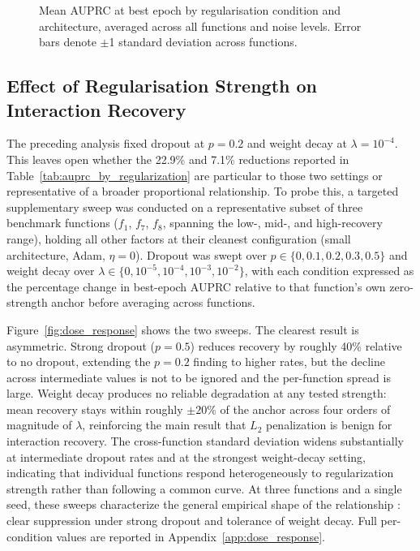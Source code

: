 \documentclass{article}
\begin{document}
\begin{figure}[htbp]
    \centering
    
    \caption{Mean AUPRC at best epoch by regularisation condition
    and architecture, averaged across all functions and noise levels.
    Error bars denote $\pm$1 standard deviation across functions.}
    \label{fig:architecture_x_regularization}
\end{figure}

\FloatBarrier

\subsection{Effect of Regularisation Strength on Interaction Recovery}
\label{sec:dose_response}

The preceding analysis fixed dropout at $p = 0.2$ and weight decay at
$\lambda = 10^{-4}$. This leaves open whether the 22.9\% and 7.1\% reductions
reported in Table~\ref{tab:auprc_by_regularization} are particular to those
two settings or representative of a broader proportional relationship. To
probe this, a targeted supplementary sweep was conducted on a representative
subset of three benchmark functions ($f_1$, $f_7$, $f_8$, spanning the low-,
mid-, and high-recovery range), holding all other factors at their cleanest
configuration (small architecture, Adam, $\eta = 0$). Dropout was swept over
$p \in \{0, 0.1, 0.2, 0.3, 0.5\}$ and weight decay over
$\lambda \in \{0, 10^{-5}, 10^{-4}, 10^{-3}, 10^{-2}\}$, with each condition
expressed as the percentage change in best-epoch AUPRC relative to that
function's own zero-strength anchor before averaging across functions.

Figure~\ref{fig:dose_response} shows the two sweeps. The clearest result is
asymmetric. Strong dropout ($p = 0.5$) reduces recovery by roughly 40\%
relative to no dropout, extending the $p = 0.2$ finding to higher rates, but
the decline across intermediate values is not to be ignored and the per-function
spread is large. Weight decay produces no reliable degradation at any tested
strength: mean recovery stays within roughly $\pm 20\%$ of the anchor across
four orders of magnitude of $\lambda$, reinforcing the main result that $L_2$
penalization is benign for interaction recovery. The cross-function standard
deviation widens substantially at intermediate dropout rates and at the
strongest weight-decay setting, indicating that individual functions respond
heterogeneously to regularization strength rather than following a common
curve. At three functions and a single seed, these sweeps characterize the
general empirical shape of the relationship : clear suppression under strong dropout and tolerance of weight decay. Full per-condition values are reported in Appendix~\ref{app:dose_response}.
\end{document}
